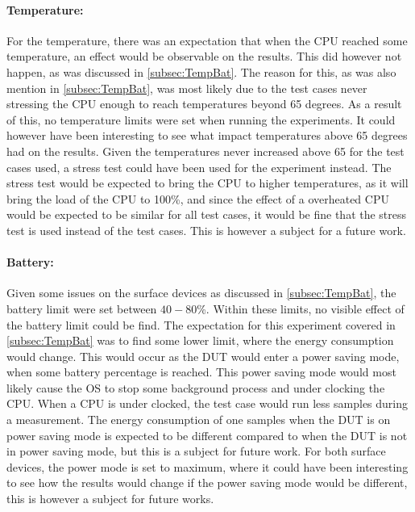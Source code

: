 \paragraph*{Temperature:} For the temperature, there was an expectation that when the CPU reached some temperature, an effect would be observable on the results. This did however not happen, as was discussed in \cref{subsec:TempBat}. The reason for this, as was also mention in \cref{subsec:TempBat}, was most likely due to the test cases never stressing the CPU enough to reach temperatures beyond 65 degrees. As a result of this, no temperature limits were set when running the experiments. It could however have been interesting to see what impact temperatures above 65 degrees had on the results. Given the temperatures never increased above 65 for the test cases used, a stress test could have been used for the experiment instead. The stress test would be expected to bring the CPU to higher temperatures, as it will bring the load of the CPU to 100\%, and since the effect of a overheated CPU would be expected to be similar for all test cases, it would be fine that the stress test is used instead of the test cases. This is however a subject for a future work.

\paragraph*{Battery:} Given some issues on the surface devices as discussed in \cref{subsec:TempBat}, the battery limit were set between $40-80$\%. Within these limits, no visible effect of the battery limit could be find. The expectation for this experiment covered in \cref{subsec:TempBat} was to find some lower limit, where the energy consumption would change. This would occur as the DUT would enter a power saving mode, when some battery percentage is reached. This power saving mode would most likely cause the OS to stop some background process and under clocking the CPU. When a CPU is under clocked, the test case would run less samples during a measurement. The energy consumption of one samples when the DUT is on power saving mode is expected to be different compared to when the DUT is not in power saving mode, but this is a subject for future work. For both surface devices, the power mode is set to maximum, where it could have been interesting to see how the results would change if the power saving mode would be different, this is however a subject for future works. 

